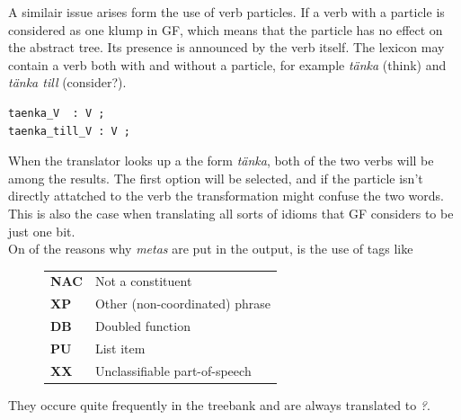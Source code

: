 \documentclass{report}
\begin{document}
A similair issue arises form the use of verb particles. If a verb with a particle is considered
as one klump in GF, which means that the particle has no effect on the abstract tree. Its presence
is announced by the verb itself. The lexicon may contain a verb both with and without a particle,
for example \emph{tänka} (think) and \emph{tänka till} (consider?).
\begin{verbatim}
taenka_V  : V ;
taenka_till_V : V ;
\end{verbatim}
When the translator looks up a the form \emph{tänka}, both of the two verbs
will be among the results. The first option will be selected, and if the
particle isn't directly attatched to the verb
the transformation might confuse the two words. This is also the case when translating
all sorts of idioms that GF considers to be just one bit.\\


On of the reasons why \textit{metas} are put in the output, is the 
use of tags like \\
\begin{figure}[h]
\begin{tabular}{ll}
\textbf{NAC} & Not a constituent\\
\textbf{XP} & Other (non-coordinated) phrase\\
\textbf{DB} & Doubled function\\
\textbf{PU} & List item\\
\textbf{XX} & Unclassifiable part-of-speech\\
\end{tabular}\label{fig:mapBadtag}
\end{figure}

They occure quite frequently in the treebank and are always translated
to \emph{?}.
\end{document}
